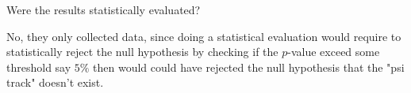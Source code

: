 \documentclass[a4paper,twoside=false,abstract=false,numbers=noenddot,
titlepage=false,headings=small,parskip=half,version=last]{scrartcl}
\begin{document}
\begin{exercise}{3} 
    Were the results statistically evaluated?
\end{exercise}
\begin{solution}
    No, they only collected data, since doing a statistical evaluation
    would require to statistically reject the null hypothesis by
    checking if the $p$-value exceed some threshold say $5\%$ then would could have
    rejected the null hypothesis that the "psi track" doesn't exist.
\end{solution}

\end{document}
